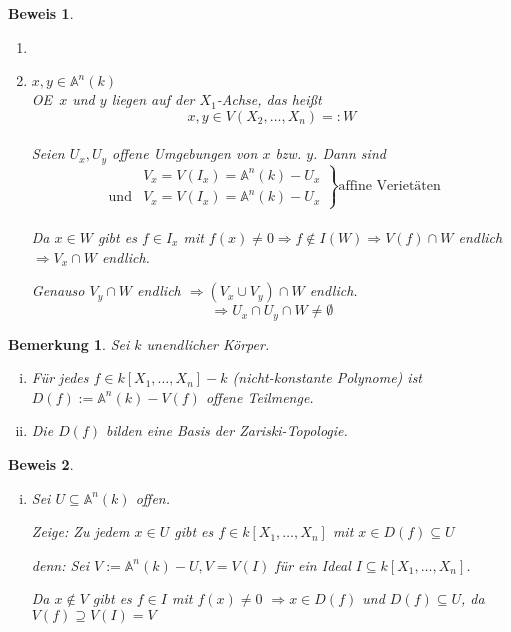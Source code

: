\documentclass[a4paper, 12pt, numbers=noendperiod, chapterprefix=true]{scrbook}
\theoremstyle{break}
\newtheorem{Bem}[Def]{Bemerkung}
\theoremstyle{nonumberbreak}
\newtheorem{Bew}{Beweis}
\theoremstyle{nonumberplain}
\newcommand{\A}{\mathbb{A}}
\renewcommand{\OE}{O\!\!E~}
\begin{document}
\begin{Bew}\begin{enumerate}[$n=1$:]
\item[$n=1$:] \checkmark
\item[{$n\ge 2$}:] $x,y \in \A ^n(k)$\\
	\OE $x$ und $y$ liegen auf der $X_1$-Achse, das hei\ss t \[x,y \in V(X_2,\dots ,X_n) =:W\]\\
	Seien $U_x,U_y$ offene Umgebungen von $x$ bzw. $y$. Dann sind\[\left.
		\begin{array}{rl}
		 & V_x=V(I_x) = \A ^n(k)-U_x\\
		 \textrm{und} & V_x=V(I_x) = \A ^n(k)-U_x
		\end{array}	\right\} \textrm{affine Veriet\"aten}\]\\
	Da $x\in W$ gibt es $f\in I_x$ mit $f(x) \neq 0 \Rightarrow f \notin I(W) \Rightarrow V(f)\cap W$ endlich $	\Rightarrow V_x \cap W$ endlich.
	
	Genauso $V_y \cap W$ endlich
	$\Rightarrow (V_x \cup V_y)\cap W$ endlich.
	\[\Rightarrow U_x \cap U_y \cap W \not= \emptyset\]
\end{enumerate}\end{Bew}

\begin{Bem}\label{bem3.6}
Sei $k$ unendlicher K\"orper. \begin{enumerate}[i)]
\item
	F\"ur jedes $f \in k[X_1,\dots ,X_n]-k$ (nicht-konstante Polynome) ist $D(f):= \A ^n(k)-V(f)$ offene Teilmenge.
\item\label{bem3.6ii}
	Die $D(f)$ bilden eine Basis der Zariski-Topologie.
\end{enumerate}\end{Bem}

\begin{Bew}\begin{enumerate}[i)]
\item[ii)]
Sei $U \subseteq \A ^n(k)$ offen.

\emph{Zeige}: Zu jedem $x\in U$ gibt es $f\in k[X_1,\dots ,X_n]$ mit $x\in D(f) \subseteq U$

\emph{denn:} Sei $V:=\A ^n(k)-U, V=V(I)$ f\"ur ein Ideal $I \subseteq k[X_1,\dots ,X_n]$.

Da $x\notin V$ gibt es $f\in I$ mit $f(x) \not= 0$ $\Rightarrow x\in D(f)$ und $D(f) \subseteq U$, da $V(f) \supseteq V(I) =V$
\end{enumerate}\end{Bew}
\end{document}
